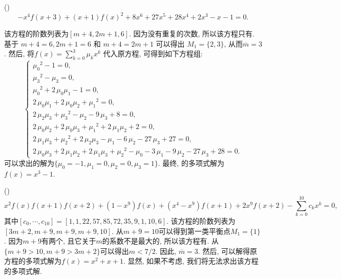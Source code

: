 \begin{example}
(\BPone{})
\begin{equation}
-x^4f(x+3)+(x+1)f(x)^2+8x^6+27x^5+28x^4+2x^3-x-1=0 \label{ep1} .
\end{equation}

该方程的阶数列表为$[m+4,2m+1,6]$. 因为没有重复的次数, 所以该方程只有\BPone{}. 基于 $m+4=6,2m+1=6$ 和 $m+4=2m+1$ 可以得出 $M_1=\{2,3\}$, 从而$\overline m = 3$. 然后, 将$f(x)=\sum\nolimits_{k=0}^3{\mu_k x^k}$ 代入原方程, 可得到如下方程组:
\begin{equation}
\left\{
\begin{array}{l}
    {\mu_{{0}}}^{2}-1=0,                                                                                                  \\
    {\mu_{{3}}}^{2}-\mu_{{3}}=0,                                                                                            \\
    {\mu_{{0}}}^{2}+2\,\mu_{{0}}\mu_{{1}}-1=0,                                                                                \\
    2\,\mu_{{0}}\mu_{{1}}+2\,\mu_{{0}}\mu_{{2}}+{\mu_{{1}}}^{2}=0,                                                                \\
    2\,\mu_{{2}}\mu_{{3}}+{\mu_{{3}}}^{2}-\mu_{{2}}-9\,\mu_{{3}}+8=0,                                                             \\
    2\,\mu_{{0}}\mu_{{2}}+2\,\mu_{{0}}\mu_{{3}}+{\mu_{{1}}}^{2}+2\,\mu_{{1}}\mu_{{2}}+2=0,                                            \\
    2\,\mu_{{1}}\mu_{{3}}+{\mu_{{2}}}^{2}+2\,\mu_{{2}}\mu_{{3}}-\mu_{{1}}-6\,\mu_{{2}}-27\,\mu_{{3}}+27=0,                              \\
    2\,\mu_{{0}}\mu_{{3}}+2\,\mu_{{1}}\mu_{{2}}+2\,\mu_{{1}}\mu_{{3}}+{\mu_{{2}}}^{2}-\mu_{{0}}-3\,\mu_{{1}}-9\,\mu_{{2}}-27\,\mu_{{3}}+28=0.
\end{array}
\right.
\label{ceqs}
\end{equation}
可以求出的解为$\{\mu_0=-1,\mu_1=0,\mu_2=0,\mu_3=1\}$. 最终, 的多项式解为$f(x)=x^3-1$.
\end{example}

\begin{example}
(\BPtwo{})
\begin{equation}
x^2f(x)f(x+1)f(x+2)+(1-x^9)f(x)+(x^4-x^9)f(x+1)+2x^9f(x+2)-\sum_{k=0}^{10}{c_k x^k}=0, \label{ep2}
\end{equation}
其中$[c_0,\cdots,c_{10}]=[1,1,22,57,85,72,35,9,1,10,6]$. 该方程的阶数列表为$[3m+2,m+9,m+9,m+9,10]$. 从$m+9=10$可以得到第一类平衡点$M_1=\{1\}$. 因为$m+9$有两个, 且它关于$m$的系数不是最大的, 所以该方程有\BPtwo{}. 从$\{m+9> 10,m+9> 3m+2\}$可以得出$m< 7/2$. 因此, $\overline m=3$. 然后, 可以解得原方程的多项式解为$f(x)=x^2+x+1$. 显然, 如果不考虑\BPtwo{}, 我们将无法求出该方程的多项式解. 
\end{example}


